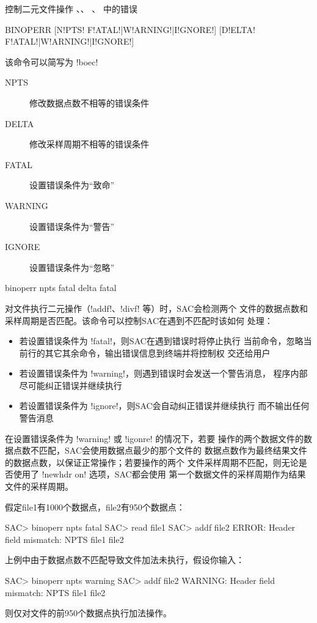 \label{cmd:binoperr}

控制二元文件操作 、、
、 中的错误

\begin{SACSTX}
BINOPERR [N!PTS! F!ATAL!|W!ARNING!|I!GNORE!] [D!ELTA! F!ATAL!|W!ARNING!|I!GNORE!]
\end{SACSTX}
该命令可以简写为 !boec!

\begin{description}
\item [NPTS]  修改数据点数不相等的错误条件
\item [DELTA] 修改采样周期不相等的错误条件
\item [FATAL] 设置错误条件为``致命''
\item [WARNING] 设置错误条件为``警告''
\item [IGNORE]  设置错误条件为``忽略''
\end{description}

\begin{SACDFT}
binoperr npts fatal delta fatal
\end{SACDFT}

对文件执行二元操作（!addf!、!divf! 等）时，SAC会检测两个
文件的数据点数和采样周期是否匹配。该命令可以控制SAC在遇到不匹配时该如何
处理：
\begin{itemize}
\item 若设置错误条件为 !fatal!，则SAC在遇到错误时将停止执行
    当前命令，忽略当前行的其它其余命令，输出错误信息到终端并将控制权
    交还给用户
\item 若设置错误条件为 !warning!，则遇到错误时会发送一个警告消息，
    程序内部尽可能纠正错误并继续执行
\item 若设置错误条件为 !ignore!，则SAC会自动纠正错误并继续执行
    而不输出任何警告消息
\end{itemize}

在设置错误条件为 !warning! 或 !igonre! 的情况下，若要
操作的两个数据文件的数据点数不匹配，SAC会使用数据点最少的那个文件的
数据点数作为最终结果文件的数据点数，以保证正常操作；若要操作的两个
文件采样周期不匹配，则无论是否使用了 !newhdr on! 选项，SAC都会使用
第一个数据文件的采样周期作为结果文件的采样周期。

假定file1有1000个数据点，file2有950个数据点：
\begin{SACCode}
SAC> binoperr npts fatal
SAC> read file1
SAC> addf file2
ERROR:  Header field mismatch: NPTS file1 file2
\end{SACCode}

上例中由于数据点数不匹配导致文件加法未执行，假设你输入：
\begin{SACCode}
SAC> binoperr npts warning
SAC> addf file2
WARNING:  Header field mismatch: NPTS file1 file2
\end{SACCode}
则仅对文件的前950个数据点执行加法操作。
